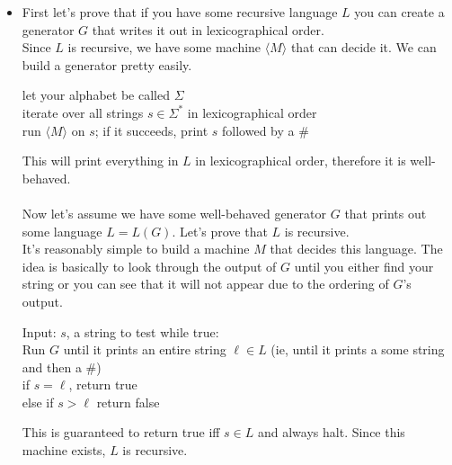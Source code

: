 \documentclass[11pt]{article}
\begin{document}
\begin{solution}
    \begin{itemize}
        \item First let's prove that if you have some recursive language $L$ you can create a generator $G$ that writes it out in lexicographical order.
            \\ Since $L$ is recursive, we have some machine $\langle M \rangle$ that can decide it. We can build a generator pretty easily. 
            \begin{algo}
                let your alphabet be called $\Sigma$
                \\ iterate over all strings $s \in \Sigma^*$ in lexicographical order \+
                \\ run $\langle M \rangle$ on $s$; if it succeeds, print $s$ followed by a $\#$
            \end{algo}
            This will print everything in $L$ in lexicographical order, therefore it is well-behaved. 
            \\ \\ Now let's assume we have some well-behaved generator $G$ that prints out some language $L = L(G)$. Let's prove that $L$ is recursive. 
            \\ It's reasonably simple to build a machine $M$ that decides this language. The idea is basically to look through the output 
            of $G$ until you either find your string or you can see that it will not appear due to the ordering of $G$'s output.
            \begin{algo}
                Input: $s$, a string to test
                while true: \+
                \\ Run $G$ until it prints an entire string $\ell \in L$ (ie, until it prints a some string and then a \#)
                \\ if $s = \ell$, return true
                \\ else if $s > \ell$ return false \-
            \end{algo}
            This is guaranteed to return true iff $s \in L$ and always halt. Since this machine exists, $L$ is recursive. 
            

\end{itemize}
\end{solution}
\end{document}
